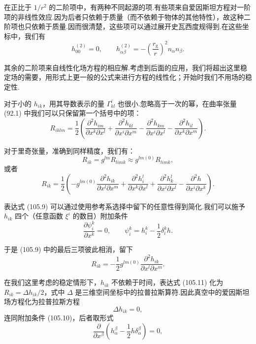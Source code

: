 在正比于 $1/r^{2}$ 的二阶项中，有两种不同起源的项.有些项来自爱因斯坦方程对一阶项的非线性效应.因为后者只依赖于质量（而不依赖于物体的其他特性），故这种二阶项也只依赖于质量.因而很清楚，这些项可以通过展开史瓦西度规得到.在这些坐标中，我们有
\begin{equation}
  h_{00}^{(2)}=0,\qquad
  h_{\alpha\beta}^{(2)}
  =-\left(\frac{r_{\mathrm{g}}}{r}\right)^{2}n_{\alpha}n_{\beta}.
\end{equation}

其余的二阶项来自线性化场方程的相应解.考虑到后面的应用，我们将超出这里稳定场的需要，用形式上更一般的公式来进行方程的线性化；开始时我们不用场的稳定性.

对于小的 $h_{ik}$，用其导数表示的量 $\Gamma_{kl}^i$ 也很小.忽略高于一次的幂，在曲率张量 (92.1) 中我们可以只保留第一个括号中的项：
\begin{equation}
  R_{iklm}=\frac{1}{2}\left(
  \frac{\partial^{2}h_{im}}{\partial x^{k}\partial x^{l}}
  +\frac{\partial^{2}h_{kl}}{\partial x^{i}\partial x^{m}}
  -\frac{\partial^{2}h_{km}}{\partial x^{i}\partial x^{l}}
  -\frac{\partial^{2}h_{il}}{\partial x^{k}\partial x^{m}}\right).
\end{equation}

对于里奇张量，准确到同样精度，我们有：
\begin{equation*}
  R_{ik}=g^{lm}R_{limk}\approx g^{lm(0)}R_{limk},
\end{equation*}
或者
\begin{equation}
  R_{ik}=\frac{1}{2}\left(
  -g^{lm(0)}\frac{\partial^{2}h_{ik}}{\partial x^{l}\partial x^{m}}
  +\frac{\partial^{2}h_i^l}{\partial x^{k}\partial x^{l}}
  +\frac{\partial^{2}h_k^l}{\partial x^{i}\partial x^{l}}
  -\frac{\partial^{2}h}{\partial x^{i}\partial x^{k}}\right).
\end{equation}

表达式 (105.9) 可以通过使用参考系选择中留下的任意性得到简化.我们可以施予 $h_{ik}$ 四个（任意函数 $\xi^i$ 的数目）附加条件
\begin{equation}
  \frac{\partial\psi_i^k}{\partial x^{k}}=0,
  \qquad
  \psi_i^k=h_i^k-\frac{1}{2}\delta_i^kh.
\end{equation}

于是 (105.9) 中的最后三项彼此相消，留下
\begin{equation}
  R_{ik}=-\frac{1}{2}g^{lm(0)}
  \frac{\partial^{2}h_{ik}}{\partial x^{l}\partial x^{m}}.
\end{equation}

在我们这里考虑的稳定情形下，$h_{ik}$ 不依赖于时间，表达式 (105.11) 化为 $R_{ik}=\Delta h_{ik}/2$，式中 $\Delta$ 是三维空间坐标中的拉普拉斯算符.因此真空中的爱因斯坦场方程化为拉普拉斯方程
\begin{equation}
  \Delta h_{ik}=0,
\end{equation}
连同附加条件 (105.10)，后者取形式
\begin{equation}
  \frac{\partial}{\partial x^{\beta}}
  \left(h_{\alpha}^{\beta}-\frac{1}{2}h\delta_{\alpha}^{\beta}\right)=0,
\end{equation}

